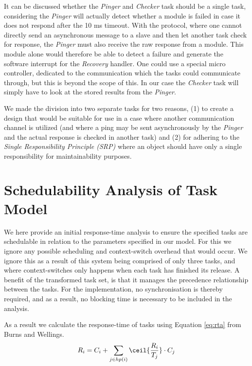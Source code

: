 It can be discussed whether the \textit{Pinger} and \textit{Checker} task should be a single task, considering the \textit{Pinger} will actually detect whether a module is failed in case it does not respond after the 10 ms timeout. With the \iic protocol, where one cannot directly send an asynchronous message to a slave and then let another task check for response, the \textit{Pinger} must also receive the raw response from a module. This module alone would therefore be able to detect a failure and generate the software interrupt for the \textit{Recovery} handler. One could use a special \iic micro controller, dedicated to the communication which the tasks could communicate through, but this is beyond the scope of this. In our case the \textit{Checker} task will simply have to look at the stored results from the \textit{Pinger}.

We made the division into two separate tasks for two reasons, (1) to create a design that would be suitable for use in a case where another communication channel is utilized (and where a ping may be sent asynchronously by the \textit{Pinger} and the actual response is checked in another task) and (2) for adhering to the \textit{Single Responsibility Principle (SRP)} where an object should have only a single responsibility for maintainability purposes.

\section{Schedulability Analysis of Task Model}
We here provide an initial response-time analysis to ensure the specified tasks are schedulable in relation to the parameters specified in our model. For this we ignore any possible scheduling and context-switch overhead that would occur. We ignore this as a result of this system being comprised of only three tasks, and where context-switches only happens when each task has finished its release. A benefit of the transformed task set, is that it manages the precedence relationship between the tasks. For the implementation, no synchronisation is thereby required, and as a result, no blocking time is necessary to be included in the analysis.

As a result we calculate the response-time of tasks using Equation \ref{eq:rta} from Burns and Wellings.
\begin{equation}
\label{eq:rta}
     R_{i} = C_{i} + \sum\limits_{j\in hp(i)} \ceil{\frac{R_{i}}{T_{j}}} \cdot C_{j}
\end{equation}

